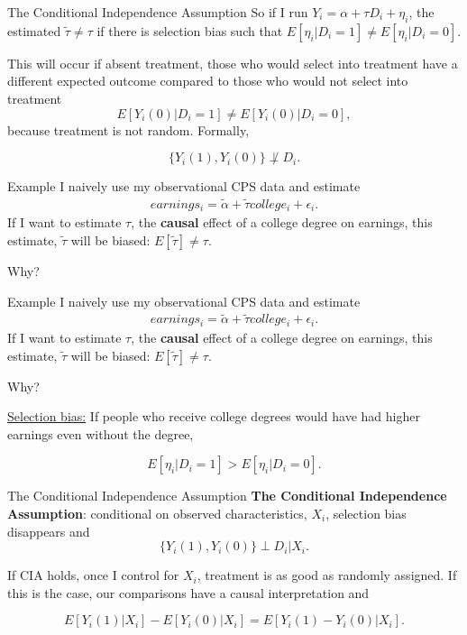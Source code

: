 \documentclass[
  ignorenonframetext,
]{beamer}
\begin{document}
\begin{frame}{The Conditional Independence Assumption}
\protect\hypertarget{the-conditional-independence-assumption-3}{}
So if I run \(Y_i=\alpha+\tau D_i+\eta_i\), the estimated
\(\tilde{\tau}\neq \tau\) if there is selection bias such that
\(E[\eta_i|D_i=1]\neq E[\eta_i|D_i=0]\).

This will occur if absent treatment, those who would select into
treatment have a different expected outcome compared to those who would
not select into treatment \[
E[Y_i(0)|D_i=1]\neq E[Y_i(0)|D_i=0],
\] because treatment is not random. Formally,

\[
\{Y_i(1), Y_i(0)\} \not\perp  D_i.
\]
\end{frame}

\begin{frame}{Example}
\protect\hypertarget{example}{}
I naively use my observational CPS data and estimate \[
\begin{split}
earnings_i=\tilde{\alpha}+\tilde{\tau} college_i+\epsilon_i.
\end{split}
\] If I want to estimate \(\tau\), the \textbf{causal} effect of a
college degree on earnings, this estimate, \(\tilde{\tau}\) will be
biased: \(E[\tilde{\tau}]\neq \tau\).

Why?
\end{frame}

\begin{frame}{Example}
\protect\hypertarget{example-1}{}
I naively use my observational CPS data and estimate \[
\begin{split}
earnings_i=\tilde{\alpha}+\tilde{\tau} college_i+\epsilon_i.
\end{split}
\] If I want to estimate \(\tau\), the \textbf{causal} effect of a
college degree on earnings, this estimate, \(\tilde{\tau}\) will be
biased: \(E[\tilde{\tau}]\neq \tau\).

Why?

\underline{Selection bias:} If people who receive college degrees would
have had higher earnings even without the degree,

\[
E[\eta_i|D_i=1]>E[\eta_i|D_i=0].
\]
\end{frame}

\begin{frame}{The Conditional Independence Assumption}
\protect\hypertarget{the-conditional-independence-assumption-4}{}
\textbf{The Conditional Independence Assumption}: conditional on
observed characteristics, \(X_i\), selection bias disappears and \[
\{Y_i(1), Y_i(0)\} \perp  D_i|X_i.
\]

If CIA holds, once I control for \(X_i\), treatment is as good as
randomly assigned. If this is the case, our comparisons have a causal
interpretation and

\[
E[Y_i(1)|X_i]-E[Y_i(0)|X_i]=E[Y_i(1)-Y_i(0)|X_i].
\]
\end{frame}
\end{document}
